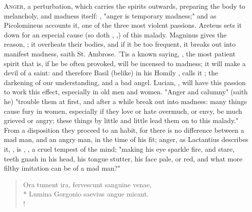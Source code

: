 \lettrine{A}{nger}, a perturbation, which carries the spirits outwards,
preparing the body to melancholy, and madness itself: , "anger is temporary madness;" and as Picolomineus
accounts it, one of the three most violent passions.
Areteus sets it down for an especial cause (so doth
\Seneca{}, ,) of this malady.
Magninus gives the reason, ; it overheats their bodies, and if it be too frequent, it
breaks out into manifest madness, saith St. Ambrose. 'Tis a known saying,
, the most patient spirit that is, if he
be often provoked, will be incensed to madness; it will make a devil of a
saint: and therefore Basil (belike) in his Homily , calls it ;
the darkening of our understanding, and a bad angel.
Lucian, , will
have this passion to work this effect, especially in old men and women. "Anger
and calumny" (saith he) "trouble them at first, and after a while break out
into madness: many things cause fury in women, especially if they love or hate
overmuch, or envy, be much grieved or angry; these things by little and little
lead them on to this malady." From a disposition they proceed to an habit, for
there is no difference between a mad man, and an angry man, in the time of his
fit; anger, as Lactantius describes it, , is , \etc{}, a
cruel tempest of the mind; "making his eye sparkle fire, and stare, teeth gnash
in his head, his tongue stutter, his face pale, or red, and what more filthy
imitation can be of a mad man?"

\begin{latin}
\begin{verse}%
Ora tument ira, fervescunt sanguine venae,\\*
Lumina Gorgonio saevius angue micant.\\!
\end{verse}%
\end{latin}

